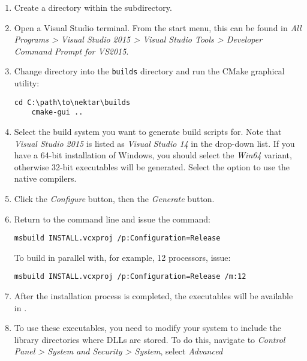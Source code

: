 \begin{enumerate}
  \begin{notebox}
    Some Windows versions do not recognise the path of a folder which has
    \inltt{++} in the name. If you think that your Windows version can not
    handle path containing special characters, you should rename
     to .
  \end{notebox}
  \item Create a  directory within the 
  subdirectory.
  \item Open a Visual Studio terminal. From the start menu, this can be found in
  \emph{All Programs > Visual Studio 2015 > Visual Studio Tools > Developer
    Command Prompt for VS2015}.
  \item Change directory into the \texttt{builds} directory and run the CMake
  graphical utility:
  \begin{lstlisting}[style=BashInputStyle]
    cd C:\path\to\nektar\builds
    cmake-gui ..
  \end{lstlisting}
  \item Select the build system you want to generate build scripts for. Note
  that \emph{Visual Studio 2015} is listed as \emph{Visual Studio 14} in the
  drop-down list. If you have a 64-bit installation of Windows, you should
  select the \emph{Win64} variant, otherwise 32-bit executables will be
  generated. Select the option to use the native compilers.
  \item Click the \emph{Configure} button, then the \emph{Generate} button.
  \item Return to the command line and issue the command:
  \begin{lstlisting}[style=BashInputStyle]
    msbuild INSTALL.vcxproj /p:Configuration=Release
  \end{lstlisting}
  To build in parallel with, for example, 12 processors, issue:
  \begin{lstlisting}[style=BashInputStyle]
    msbuild INSTALL.vcxproj /p:Configuration=Release /m:12
  \end{lstlisting}
  \item After the installation process is completed, the executables will be
  available in .
  \item To use these executables, you need to modify your system  to
  include the library directories where DLLs are stored. To do this, navigate to
  \emph{Control Panel > System and Security > System}, select \emph{Advanced
}
\end{enumerate}
